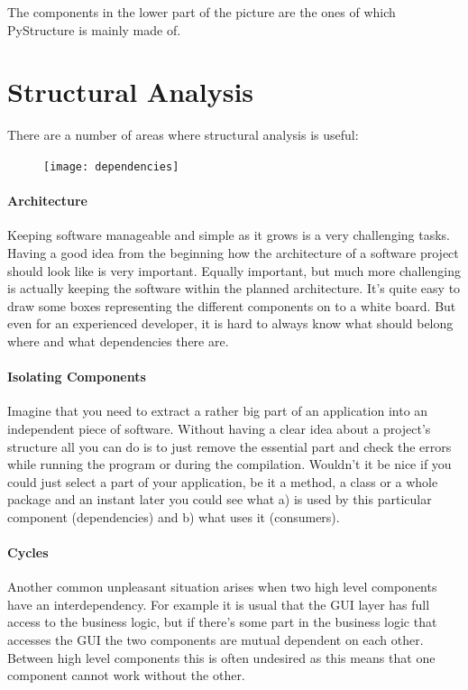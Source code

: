 \documentclass[12pt,halfparskip,DIV11,BCOR10mm]{scrreprt}
\begin{document}
The components in the lower part of the picture are the ones of which PyStructure is mainly made of. 


\section{Structural Analysis}

There are a number of areas where structural analysis is useful:

\begin{figure}
    \vspace{-0.3cm}
    \texttt{[image: dependencies]}
    \vspace{-1cm}
\end{figure}

\paragraph{Architecture}
Keeping software manageable and simple as it grows is a very challenging tasks. Having a good idea from the beginning how the architecture of a software project should look like is very important. Equally important, but much more challenging is actually keeping the software within the planned architecture. It's quite easy to draw some boxes representing the different components on to a white board. But even for an experienced developer, it is hard to always know what should belong where and what dependencies there are.

\paragraph{Isolating Components}
Imagine that you need to extract a rather big part of an application into an independent piece of software. Without having a clear idea about a project's structure all you can do is to just remove the essential part and check the errors while running the program or during the compilation. Wouldn't it be nice if you could just select a part of your application, be it a method, a class or a whole package and an instant later you could see what a) is used by this particular component (dependencies) and b) what uses it (consumers).

\paragraph{Cycles}
Another common unpleasant situation arises when two high level components have an interdependency. For example it is usual that the GUI layer has full access to the business logic, but if there's some part in the business logic that accesses the GUI the two components are mutual dependent on each other. Between high level components this is often undesired as this means that one component cannot work without the other.
\end{document}

